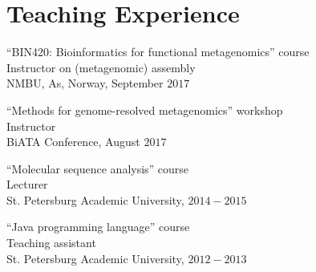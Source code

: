 \blankline

\section{Teaching Experience}
\vspace*{-.7cm}
\begin{outerlist}
\item
``BIN420: Bioinformatics for functional metagenomics'' course\\
Instructor on (metagenomic) assembly\\
NMBU, As, Norway, September $2017$
\item
``Methods for genome-resolved metagenomics'' workshop\\
Instructor\\
BiATA Conference, August $2017$
\item
``Molecular sequence analysis'' course\\
Lecturer\\
St. Petersburg Academic University, $2014-2015$
\item
``Java programming language'' course\\
Teaching assistant\\
St. Petersburg Academic University, $2012-2013$
\end{outerlist}
